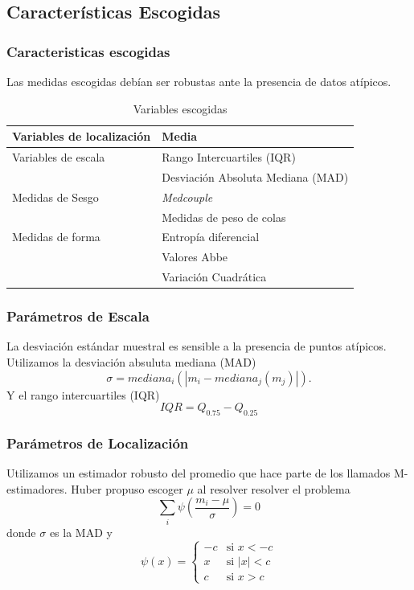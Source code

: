 \documentclass{beamer}
\begin{document}
\subsection{Características Escogidas}
\begin{frame}
\frametitle{Caracteristicas escogidas}
Las medidas escogidas debían ser robustas ante la presencia de datos atípicos.
\begin{table}
  \centering
  \begin{tabular}{ll}
    \hline
    Variables de localización & Media \\
    \hline
    Variables de escala & Rango Intercuartiles (IQR) \\
    & Desviación Absoluta Mediana (MAD) \\
    Medidas de Sesgo & \textit{Medcouple} \\
    & Medidas de peso de colas \\
    Medidas de forma & Entropía diferencial \\
    & Valores Abbe \\
    & Variación Cuadrática
  \end{tabular}
  \caption{Variables escogidas}
\end{table}

\end{frame}

\begin{frame}
  \frametitle{Parámetros de Escala}
  La desviación estándar muestral es sensible a la presencia de puntos atípicos. Utilizamos la desviación absuluta mediana (MAD)
  \begin{equation}
    \sigma = mediana_i(|m_i-mediana_j(m_j)|).
  \end{equation} 
  Y el rango intercuartiles (IQR)
  \begin{equation}
    IQR = Q_{0.75}-Q_{0.25}
  \end{equation}
\end{frame}

\begin{frame}
  \frametitle{Parámetros de Localización}
  Utilizamos un estimador robusto del promedio que hace parte de los llamados M-estimadores. Huber \cite{huber_robust_2011} propuso escoger $\mu$ al resolver resolver el problema 
  \begin{equation}
    \sum_i\psi\left(\frac{m_i-\mu}{\sigma}\right) = 0
  \end{equation}
  donde $\sigma$ es la MAD y 
  \begin{equation}
    \psi(x) = \begin{cases} 
      -c &\mbox{si } x < -c \\ 
      x & \mbox{si } |x|<c\\
      c & \mbox{si } x>c
    \end{cases}
  \end{equation}
\end{frame}
\end{document}

